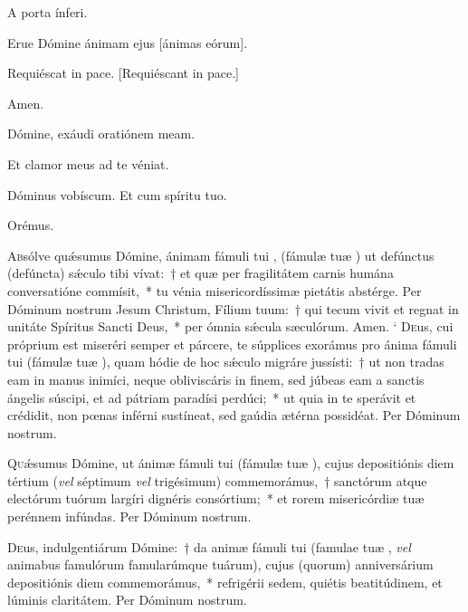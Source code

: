 \documentclass[vesperale_romanum]{subfiles}
\begin{document}

\vv A porta ínferi.

\rr Erue Dómine ánimam ejus [ánimas eórum].

\vv Requiéscat in pace. [Requiéscant in pace.]

\rr Amen.

\vv Dómine, exáudi oratiónem meam.

\rr Et clamor meus ad te véniat.

\vv Dóminus vobíscum. \rr Et cum spíritu tuo.

{\centering Orémus.\par}


\oratio

\lettrine{A}{b}sólve quǽsumus Dómine, ánimam fámuli tui \nomen{}, (fámulæ tuæ \nomen{}) ut defúnctus (defúncta) sǽculo tibi vívat:~† et quæ per fragilitátem carnis humána conversatióne commísit,~* tu vénia misericordíssimæ pietátis abstérge. Per Dóminum nostrum Jesum Christum, Fílium tuum:~† qui tecum vivit et regnat in unitáte Spíritus Sancti Deus,~* per ómnia sǽcula sæculórum. \rr Amen.
`
\lettrine{D}{e}us, cui próprium est miseréri semper et párcere, te súpplices exorámus pro ánima fámuli tui \nomen{} (fámulæ tuæ \nomen{}),
quam hódie de hoc sǽculo migráre jussísti:~† ut non tradas eam in manus inimíci,
neque obliviscáris in finem, sed júbeas eam a san\-ctis ángelis súscipi, et ad pátriam paradísi perdúci;~* 
ut quia in te sperávit et crédidit, non pœnas inférni sustíneat, sed gaúdia ætérna possidéat. Per Dóminum nostrum.



\lettrine{Q}{u}ǽsumus Dómine, ut ánimæ fámuli tui \nomen{} (fámulæ tuæ \nomen{}), cujus depositiónis diem tértium (\textit{vel} séptimum \textit{vel} trigésimum) commemorámus,~† san\-ctórum atque ele\-ctórum tuórum largíri dignéris consórtium;~* et rorem misericórdiæ tuæ perénnem infúndas. Per Dóminum nostrum.


\lettrine{D}{e}us, indulgentiárum Dómine:~† da animæ fámuli tui \nomen{}
(famulae tuæ \nomen, \textit{vel} animabus famulórum famularúmque
tuárum), cujus (quorum) anniversárium depositiónis diem commemorámus,~* refrigérii sedem, quiétis beatitúdinem, et lúminis
claritátem. Per Dóminum nostrum.
\end{document}
